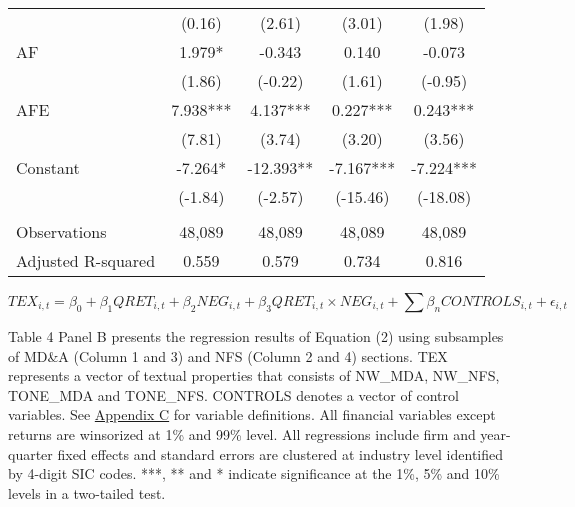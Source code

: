 \begin{table}[H]
\begin{center}
\begin{tabular}{lcccc}
			& (0.16) & (2.61) & (3.01) & (1.98) \\
			AF & 1.979* & -0.343 & 0.140 & -0.073 \\
			& (1.86) & (-0.22) & (1.61) & (-0.95) \\
			AFE & 7.938*** & 4.137*** & 0.227*** & 0.243*** \\
			& (7.81) & (3.74) & (3.20) & (3.56) \\
			Constant & -7.264* & -12.393** & -7.167*** & -7.224*** \\
			& (-1.84) & (-2.57) & (-15.46) & (-18.08) \\
			&   &   &   &  \\
			Observations & 48,089 & 48,089 & 48,089 & 48,089 \\
			Adjusted R-squared & 0.559 & 0.579 & 0.734 & 0.816 \\
			\bottomrule
			\bottomrule
		\end{tabular}%
	\end{center}
\begin{footnotesize}
	\setcounter{equation}{1}
	\begin{equation}
		TEX_{i,t}=\beta_0+\beta_1QRET_{i,t}+\beta_2NEG_{i,t}+\beta_3QRET_{i,t}\times NEG_{i,t}+\sum\beta_nCONTROLS_{i,t}+\epsilon_{i,t}
	\end{equation}
	
	\noindent Table 4 Panel B presents the regression results of Equation (2) using subsamples of MD\&A (Column 1 and 3) and NFS (Column 2 and 4) sections. TEX represents a vector of textual properties that consists of NW\_MDA, NW\_NFS, TONE\_MDA and TONE\_NFS. CONTROLS denotes a vector of control variables. See \hyperref[appc]{Appendix C} for variable definitions. All financial variables except returns are winsorized at 1\% and 99\% level. All regressions include firm and year-quarter fixed effects and standard errors are clustered at industry level identified by 4-digit SIC codes. ***, ** and * indicate significance at the 1\%, 5\% and 10\% levels in a two-tailed test.
\end{footnotesize}
\end{table}%